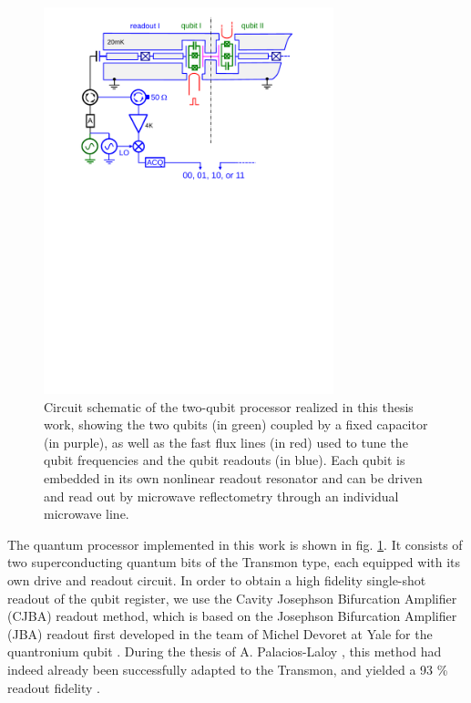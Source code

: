 %
\begin{figure}[ht!]
 \centering \includegraphics[width=0.75\textwidth]{./material/papers/grover/figures/2_qubit_processor_schematic}
\caption[Circuit schematic of the realized two-qubit processor]{Circuit schematic of the two-qubit processor realized in this thesis work, showing the two qubits (in green) coupled by
a fixed capacitor (in purple), as well as the fast flux lines (in
red) used to tune the qubit frequencies and the qubit readouts (in
blue). Each qubit is embedded in its own nonlinear readout resonator
and can be driven and read out by microwave reflectometry through an individual microwave line.}


\label{fig:two_qubit_processor_schematic} %
\end{figure}


The quantum processor implemented in this work is shown in fig. \ref{fig:two_qubit_processor_schematic}.
It consists of two superconducting quantum bits of the Transmon type,
each equipped with its own drive and readout circuit. In order to
obtain a high fidelity single-shot readout of the qubit register,
we use the Cavity Josephson Bifurcation Amplifier (CJBA) readout method, which is based on the Josephson Bifurcation Amplifier (JBA) readout first
developed in the team of Michel Devoret at Yale for the quantronium
qubit \citep{siddiqi_rf-driven_2004,vijay_invited_2009,siddiqi_dispersive_2006}. During the thesis of A. Palacios-Laloy \citep{palacios-laloy_superconducting_2010}, this method had indeed already been successfully adapted to the Transmon, and
yielded a 93 \% readout fidelity \citep{mallet_single-shot_2009}.

